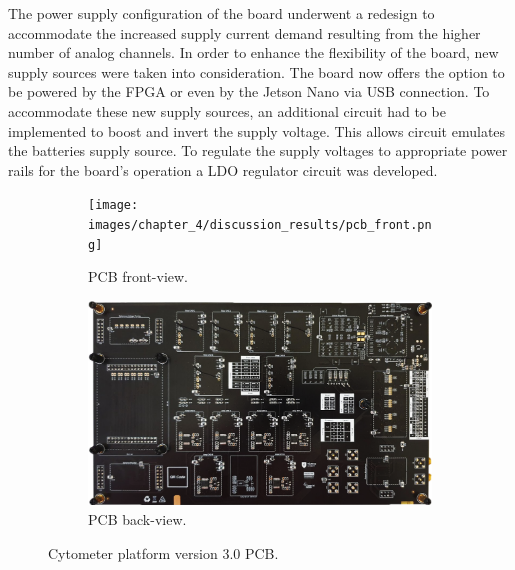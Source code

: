 The power supply configuration of the board underwent a redesign to accommodate the increased supply current demand resulting from the higher number of analog channels. In order to enhance the flexibility of the board, new supply sources were taken into consideration. The board now offers the option to be powered by the \ac{FPGA} or even by the Jetson Nano via \ac{USB} connection. To accommodate these new supply sources, an additional circuit had to be implemented to boost and invert the supply voltage. This allows circuit emulates the batteries supply source. To regulate the supply voltages to appropriate power rails for the board's operation a \ac{LDO} regulator circuit was developed.

\begin{figure}[p!]
    \centering
    \begin{subfigure}[b]{\textwidth}
        \centering
        \texttt{[image: images/chapter\_4/discussion\_results/pcb\_front.png]}
        \caption{PCB front-view.}
        \vspace{10pt}
        \label{figure:front-pcb}
    \end{subfigure}
    \centering
    \begin{subfigure}[b]{\textwidth}
        \centering
        \includegraphics[width=\textwidth]{images/chapter_4/discussion_results/pcb_back.png}
        \caption{PCB back-view.}
        \label{figure:back-pcb}
    \end{subfigure}
    \caption{Cytometer platform version 3.0 PCB.}
    \label{figure:cyto-pcb}
\end{figure}

